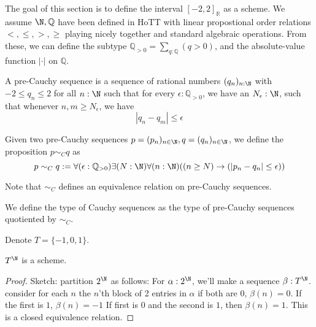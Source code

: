 The goal of this section is to define the interval $[-2,2]_\mathbb R$ as a scheme. 
We assume $\N, \mathbb Q$ have been defined in HoTT
with linear propostional order relations $<,\leq, > ,\geq$ playing nicely together 
and standard algebraic operations. 
From these, we can define the subtype $\mathbb Q_{>0}=\sum_{q : \mathbb Q} (q>0)$, 
and the absolute-value function $|\cdot|$ on $\mathbb Q$. 

\begin{definition}
  A pre-Cauchy sequence is a sequence of rational numbers $(q_n)_{n: \N}$ with $-2 \leq q_n \leq 2$ 
  for all $n:\N$
  such that for every $\epsilon: \mathbb Q_{>0}$, we have an $N_\epsilon:\N$, 
  such that whenever $n,m \geq N_\epsilon$, we have 
\begin{equation}
  | q_n - q_m | \leq \epsilon
\end{equation} 
\end{definition}

\begin{definition}
Given two pre-Cauchy sequences $p = (p_n)_{n\in\N}, q=(q_n)_{n\in\N}$, 
we define the proposition $p \sim_C  q$ as 
\begin{equation}
  p \sim_C q : = \forall (\epsilon : \mathbb Q_{>0} )\exists ( N :\N) \forall (n : \N) ((n \geq N) \to 
  (| p_n - q_n| \leq  \epsilon))
\end{equation}
\end{definition}
Note that $\sim_C$ defines an equivalence relation on pre-Cauchy sequences. 
\begin{definition}
We define the type of Cauchy sequences as the type of pre-Cauchy sequences quotiented by $\sim_C$. 
\end{definition}

%
%
Denote $T = \{-1,0,1\}$. 
\begin{lemma}
  $T^\N$ is a scheme. 
\end{lemma}
\begin{proof}
  Sketch: partition $2^\N$ as follows: 
  For $\alpha: 2^\N$, we'll make a sequence $\beta: T^\N$.
  consider for each $n$ the $n$'th block of 2 entries in $\alpha$
  if both are $0$, $\beta(n) = 0$. 
  If the first is $1$, $\beta(n) = -1$
  If first is $0$ and the second is $1$, then $\beta(n) = 1$. 
  This is a closed equivalence relation. 
\end{proof} 

